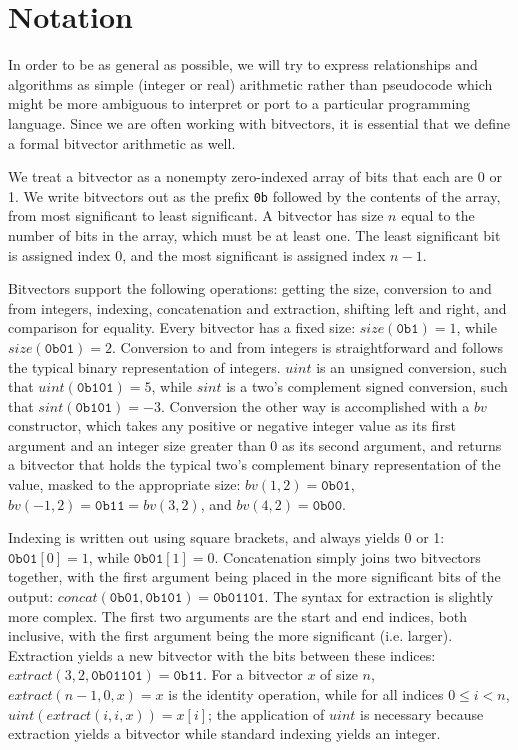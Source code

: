 \documentclass[letterpaper,10pt]{article}
\begin{document}
\section{Notation}

In order to be as general as possible, we will try to express relationships and algorithms as simple (integer or real) arithmetic rather than pseudocode which might be more ambiguous to interpret or port to a particular programming language. Since we are often working with bitvectors, it is essential that we define a formal bitvector arithmetic as well.

We treat a bitvector as a nonempty zero-indexed array of bits that each are 0 or 1. We write bitvectors out as the prefix \texttt{0b} followed by the contents of the array, from most significant to least significant. A bitvector has size $n$ equal to the number of bits in the array, which must be at least one. The least significant bit is assigned index 0, and the most significant is assigned index $n-1$.

Bitvectors support the following operations: getting the size, conversion to and from integers, indexing, concatenation and extraction, shifting left and right, and comparison for equality. Every bitvector has a fixed size: $size(\texttt{0b1}) = 1$, while $size(\texttt{0b01}) = 2$. Conversion to and from integers is straightforward and follows the typical binary representation of integers. $uint$ is an unsigned conversion, such that $uint(\texttt{0b101}) = 5$, while $sint$ is a two's complement signed conversion, such that $sint(\texttt{0b101}) = -3$. Conversion the other way is accomplished with a $bv$ constructor, which takes any positive or negative integer value as its first argument and an integer size greater than 0 as its second argument, and returns a bitvector that holds the typical two's complement binary representation of the value, masked to the appropriate size: $bv(1, 2) = \texttt{0b01}$, $bv(-1, 2) = \texttt{0b11} = bv(3, 2)$, and $bv(4, 2) = \texttt{0b00}$.

Indexing is written out using square brackets, and always yields 0 or 1: $\texttt{0b01}[0] = 1$, while $\texttt{0b01}[1] = 0$. Concatenation simply joins two bitvectors together, with the first argument being placed in the more significant bits of the output: $concat(\texttt{0b01}, \texttt{0b101}) = \texttt{0b01101}$. The syntax for extraction is slightly more complex. The first two arguments are the start and end indices, both inclusive, with the first argument being the more significant (i.e. larger). Extraction yields a new bitvector with the bits between these indices: $extract(3, 2, \texttt{0b01101}) = \texttt{0b11}$. For a bitvector $x$ of size $n$, $extract(n-1, 0, x) = x$ is the identity operation, while for all indices $0 \leq i < n$, $uint(extract(i, i, x)) = x[i]$; the application of $uint$ is necessary because extraction yields a bitvector while standard indexing yields an integer.
\end{document}
